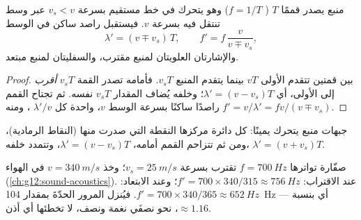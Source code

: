\begin{proposition}\label{prop:g12:doppler-effect:moving-source}
منبع يصدر قممًا  $T$ ( $f = 1/T$) وهو يتحرك في خط
مستقيم بسرعة $v_s < v$ عبر وسط تنتقل فيه  بسرعة $v$. فيستقبل
راصد ساكن في الوسط
\[
\lambda' = (v \mp v_s)\,T, \qquad f' = f\,\frac{v}{v \mp v_s},
\]
والإشارتان العلويتان لمنبع مقترب، والسفليتان لمنبع مبتعد.
\end{proposition}

\begin{proof}
بين قمتين تتقدم الأولى $vT$ بينما يتقدم المنبع $v_s T$. فأمامه تصدر
القمة  $v_s T$ \emph{أقرب} إلى الأولى، أي $\lambda' = (v - v_s)T$؛
وخلفه يُضاف المقدار $v_s T$ نفسه. ثم تجتاح القمم راصدًا ساكنًا
بسرعة الوسط $v$، واحدة كل $\lambda'/v$ ، ومنه $f' = v/\lambda' = f v/(v \mp v_s)$.
\end{proof}

\begin{omfigure}

{\small جبهات  منبع يتحرك يمينًا: كل دائرة مركزها النقطة التي
صدرت منها (النقاط الرمادية)، ومن ثم تتزاحم القمم أمامه، $\lambda' = (v - v_s)T$،
وتتمدد خلفه، $\lambda' = (v + v_s)T$.}
\end{omfigure}

\begin{example}\label{ex:g12:doppler-effect:siren}
صفّارة تواترها $f = \qty{700}{Hz}$ تقترب بسرعة $v_s = \qty{25}{m/s}$؛ وخذ
$v = \qty{340}{m/s}$ في الهواء (\cref{ch:g12:sound-acoustics}). عند الاقتراب:
$f' = 700 \times 340/315 \approx \qty{756}{Hz}$؛ وعند الابتعاد:
$f' = 700 \times 340/365 \approx \qty{652}{Hz}$. فيُنزل المرور الحدّةَ بمقدار \qty{104}{Hz}
--- أي بنسبة $\approx 1.16$، نحو نصفَي نغمة ونصف، لا تخطئها أي أذن.
\end{example}

